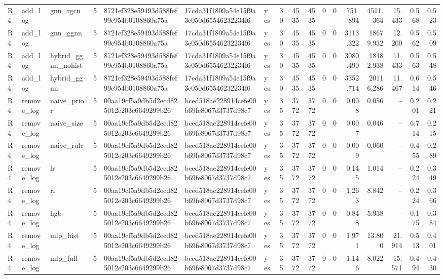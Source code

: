 \begin{table}[htbp]
{\begin{tabular}{lllrlllrrrrrrrrrr}
R4 & add\_log & gnn\_rgcn & 5 & 8721ef328e59493d588fef99e954b0108860a75a & 17cda31f1809a54e15f9a3e050d65546232234f6 & yes & 30 & 4535 & 4535 & 0 & 0 & 751.894 & 4511.364 & 15.433 & 0.568 & 0.523 \\
R4 & add\_log & gnn\_ggnn & 5 & 8721ef328e59493d588fef99e954b0108860a75a & 17cda31f1809a54e15f9a3e050d65546232234f6 & yes & 30 & 4535 & 4535 & 0 & 0 & 3113.322 & 18679.932 & 12.200 & 0.562 & 0.509 \\
R4 & add\_log & hybrid\_ggnn\_nohist & 5 & 8721ef328e59493d588fef99e954b0108860a75a & 17cda31f1809a54e15f9a3e050d65546232234f6 & yes & 30 & 4535 & 4535 & 0 & 0 & 3080.490 & 18482.938 & 11.433 & 0.563 & 0.548 \\
R4 & add\_log & hybrid\_ggnn & 5 & 8721ef328e59493d588fef99e954b0108860a75a & 17cda31f1809a54e15f9a3e050d65546232234f6 & yes & 30 & 4535 & 4535 & 0 & 0 & 3352.714 & 20116.286 & 11.467 & 0.614 & 0.546 \\
R4 & remove\_log & naive\_prior & 5 & 00aa19cf5a9db5d2ecd825012e203c6649299b26 & bced518ae228914cefe00b69fe8067d3737d98c7 & yes & 35 & 3772 & 3772 & 0 & 0 & 0.008 & 0.056 & -- & 0.201 & 0.221 \\
R4 & remove\_log & naive\_size & 5 & 00aa19cf5a9db5d2ecd825012e203c6649299b26 & bced518ae228914cefe00b69fe8067d3737d98c7 & yes & 35 & 3772 & 3772 & 0 & 0 & 0.007 & 0.046 & -- & 6.714 & 0.215 \\
R4 & remove\_log & naive\_rule & 5 & 00aa19cf5a9db5d2ecd825012e203c6649299b26 & bced518ae228914cefe00b69fe8067d3737d98c7 & yes & 35 & 3772 & 3772 & 0 & 0 & 0.009 & 0.060 & -- & 0.455 & 0.289 \\
R4 & remove\_log & lr & 5 & 00aa19cf5a9db5d2ecd825012e203c6649299b26 & bced518ae228914cefe00b69fe8067d3737d98c7 & yes & 35 & 3772 & 3772 & 0 & 0 & 0.145 & 1.014 & -- & 0.224 & 0.349 \\
R4 & remove\_log & rf & 5 & 00aa19cf5a9db5d2ecd825012e203c6649299b26 & bced518ae228914cefe00b69fe8067d3737d98c7 & yes & 35 & 3772 & 3772 & 0 & 0 & 1.263 & 8.842 & -- & 0.224 & 0.366 \\
R4 & remove\_log & hgb & 5 & 00aa19cf5a9db5d2ecd825012e203c6649299b26 & bced518ae228914cefe00b69fe8067d3737d98c7 & yes & 35 & 3772 & 3772 & 0 & 0 & 0.848 & 5.938 & -- & 0.175 & 0.384 \\
R4 & remove\_log & mlp\_hist & 5 & 00aa19cf5a9db5d2ecd825012e203c6649299b26 & bced518ae228914cefe00b69fe8067d3737d98c7 & yes & 35 & 3772 & 3772 & 0 & 0 & 1.971 & 13.800 & 21.914 & 0.513 & 0.401 \\
R4 & remove\_log & mlp\_full & 5 & 00aa19cf5a9db5d2ecd825012e203c6649299b26 & bced518ae228914cefe00b69fe8067d3737d98c7 & yes & 35 & 3772 & 3772 & 0 & 0 & 1.146 & 8.022 & 15.571 & 0.494 & 0.430 \\

\end{tabular}}
\end{table}
